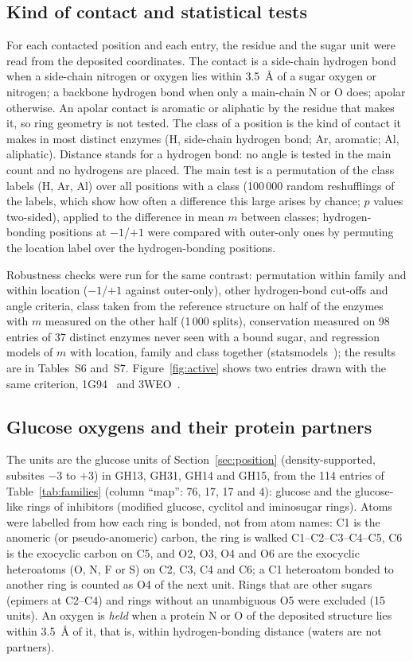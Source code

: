 \documentclass[preprint,12pt]{elsarticle}
\begin{document}
\subsection{Kind of contact and statistical tests}\label{sec:methods_contacts}
For each contacted position and each entry, the residue and the sugar unit were read from the deposited coordinates. The contact is a side-chain hydrogen bond when a side-chain nitrogen or
oxygen lies within 3.5~\AA{} of a sugar oxygen or nitrogen; a backbone hydrogen bond when only a main-chain N or O
does; apolar otherwise. An apolar contact is aromatic or aliphatic by the residue that makes it, so ring geometry is
not tested. The class of a position is the kind of contact it makes in most distinct enzymes (H, side-chain hydrogen
bond; Ar, aromatic; Al, aliphatic). Distance stands for a hydrogen bond: no angle is tested in the main count and no hydrogens are placed. The main test is a permutation of the class labels (H, Ar, Al) over all positions with a class (100\,000 random reshufflings of the labels, which show how often a difference this large arises by chance; $p$ values two-sided), applied to the difference in mean $m$ between classes; hydrogen-bonding positions at $-1$/$+1$ were compared with outer-only ones by permuting the location label over the hydrogen-bonding positions.

Robustness checks were run for the same contrast: permutation within family and within location ($-1$/$+1$ against outer-only), other hydrogen-bond cut-offs and angle criteria, class taken from the reference structure on half of the enzymes with $m$ measured on the other half (1\,000 splits), conservation measured on 98 entries of 37 distinct enzymes never seen with a bound sugar, and regression models of $m$ with location, family and class together (statsmodels~\citep{Seabold2010}); the results are in Tables~S6 and~S7. Figure~\ref{fig:active} shows two entries drawn with the same criterion, 1G94~\citep{Aghajari2002} and 3WEO~\citep{Tagami2015}.

\subsection{Glucose oxygens and their protein partners}\label{sec:methods_map}
The units are the glucose units of Section~\ref{sec:position} (density-supported, subsites $-3$ to $+3$) in GH13,
GH31, GH14 and GH15, from the 114 entries of Table~\ref{tab:families} (column ``map'': 76, 17, 17 and 4): glucose and the glucose-like rings of inhibitors (modified glucose,
cyclitol and iminosugar rings). Atoms were labelled from how each ring is bonded, not
from atom names: C1 is the anomeric (or pseudo-anomeric) carbon, the ring is walked C1--C2--C3--C4--C5, C6 is the
exocyclic carbon on C5, and O2, O3, O4 and O6 are the exocyclic heteroatoms (O, N, F or S) on C2, C3, C4 and C6;
a C1 heteroatom bonded to another ring is counted as O4 of the next unit. Rings that are other sugars (epimers at C2--C4) and rings without an unambiguous O5 were excluded (15 units). An oxygen is \emph{held} when a protein N or O
of the deposited structure lies within 3.5~\AA{} of it, that is, within hydrogen-bonding distance (waters are
not partners).
\end{document}
